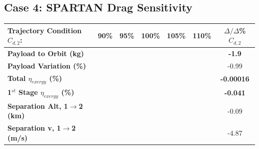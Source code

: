 \subsection{Case 4: SPARTAN Drag Sensitivity}\label{sec:dragvariation}

\begin{table}[ht!]
	\centering
	\begin{tabular}{l c c c c c c} 
		\hline \textbf{Trajectory Condition}   \qquad  $C_{d,2}$: 
		&90\%
		&95\%
		&100\%
		&105\%
		&110\%
		& $\Delta/\Delta$\%$C_{d,2}$
		\\
		\hline \textbf{Payload to Orbit (kg)}
		& \textbf{\PayloadToOrbitCdNinetyNoReturn}
		& \textbf{\PayloadToOrbitCdNinetyFiveNoReturn}
		& \textbf{\PayloadToOrbitCdStandardNoReturn}
		& \textbf{\PayloadToOrbitCdOneHundredFiveNoReturn}
		& \textbf{\PayloadToOrbitCdOneHundredTenNoReturn}
		&\textbf{-1.9}
		\\
		\textbf{Payload Variation (\%)}
		& \PayloadVarCdNinetyNoReturn
		& \PayloadVarCdNinetyFiveNoReturn
		& \PayloadVarCdStandardNoReturn
		& \PayloadVarCdOneHundredFiveNoReturn
		& \PayloadVarCdOneHundredTenNoReturn
		&-0.99
		\\
		\textbf{Total $\eta_{exergy}$ (\%)}
		& \textbf{\totalExergyEffCdNinetyNoReturn}
		& \textbf{\totalExergyEffCdNinetyFiveNoReturn}
		& \textbf{\totalExergyEffCdStandardNoReturn}
		& \textbf{\totalExergyEffCdOneHundredFiveNoReturn}
		& \textbf{\totalExergyEffCdOneHundredTenNoReturn}
		& \textbf{-0.00016}
		\\
		\hline 
		\textbf{1$^{st}$ Stage $\eta_{exergy}$ (\%)}
		& \textbf{\firstExergyEffCdNinetyNoReturn}
		& \textbf{\firstExergyEffCdNinetyFiveNoReturn}
		& \textbf{\firstExergyEffCdStandardNoReturn}
		& \textbf{\firstExergyEffCdOneHundredFiveNoReturn}
		& \textbf{\firstExergyEffCdOneHundredTenNoReturn}
		& \textbf{-0.041}
		\\
		\textbf{Separation Alt, 1$\rightarrow$2 (km)}
		& \firstsecondSeparationAltCdNinetyNoReturn
		& \firstsecondSeparationAltCdNinetyFiveNoReturn
		& \firstsecondSeparationAltCdStandardNoReturn
		& \firstsecondSeparationAltCdOneHundredFiveNoReturn
		& \firstsecondSeparationAltCdOneHundredTenNoReturn
		&-0.09
		\\
		\textbf{Separation v, 1$\rightarrow$2 (m/s)}
		& \firstsecondSeparationvCdNinetyNoReturn
		& \firstsecondSeparationvCdNinetyFiveNoReturn
		& \firstsecondSeparationvCdStandardNoReturn
		& \firstsecondSeparationvCdOneHundredFiveNoReturn
		& \firstsecondSeparationvCdOneHundredTenNoReturn
		&-4.87
		\\

\end{tabular}
\end{table}
